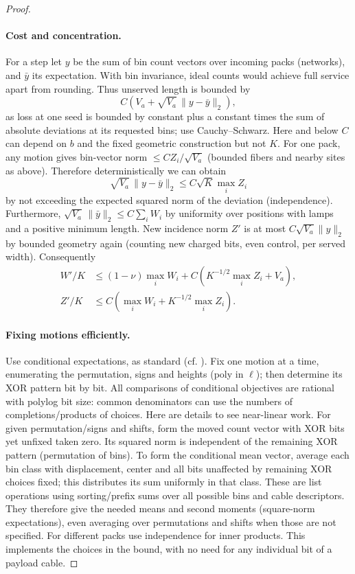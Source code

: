 \documentclass[11pt,letterpaper]{article}
\theoremstyle{definition}
\numberwithin{equation}{section}
\begin{document}
\begin{proof}
\paragraph{Cost and concentration.}
For a step let $y$ be the sum of bin count vectors over incoming
packs (networks), and $\bar y$ its expectation. With bin invariance, ideal counts would achieve
full service apart from rounding. Thus unserved length is bounded by
\[
  C\left(V_a+\sqrt{V_a}\,\lVert y-\bar y\rVert_2\right),
\]
as loss at one seed is bounded by constant plus a constant times the sum of absolute
deviations at its requested bins; use Cauchy--Schwarz. Here and below $C$ can depend on $b$
and the fixed geometric construction but not $K$. For one pack, any motion gives bin-vector
norm $\le CZ_i/\sqrt{V_a}$ (bounded fibers and nearby sites as above). Therefore deterministically
we can obtain
\[
  \sqrt{V_a}\,\lVert y-\bar y\rVert_2 \le C\sqrt{K}\max_i Z_i
\]
by not exceeding the expected squared norm of the deviation (independence). Furthermore,
$\sqrt{V_a}\,\lVert\bar y\rVert_2\le C\sum_i W_i$ by uniformity over positions with lamps and a
positive minimum length.
New incidence norm $Z'$ is at most $C\sqrt{V_a}\lVert y\rVert_2$ by bounded geometry again (counting new
charged bits, even control, per served width). Consequently
\[
  \begin{aligned}
    W'/K &\le(1-\nu)\max_i W_i+ C(K^{-1/2}\max_i Z_i+V_a), \\
    Z'/K &\le C(\max_i W_i+K^{-1/2}\max_i Z_i).
  \end{aligned}
\]
\paragraph{Fixing motions efficiently.}
Use conditional expectations, as standard (cf. \cite{Raghavan}). Fix
one motion at a time, enumerating the permutation, signs and heights (poly in $\ell$); then
determine its XOR pattern bit by bit. All comparisons of conditional objectives are rational
with polylog bit size: common denominators can use the numbers of completions/products
of choices. Here are details to see near-linear work. For given permutation/signs and shifts,
form the moved count vector with XOR bits yet unfixed taken zero. Its squared norm is
independent of the remaining XOR pattern (permutation of bins). To form the conditional
mean vector, average each bin class with displacement, center and all bits unaffected by
remaining XOR choices fixed; this distributes its sum uniformly in that class. These are
list operations using sorting/prefix sums over all possible bins and cable descriptors. They
therefore give the needed means and second moments (square-norm expectations), even
averaging over permutations and shifts when those are not specified. For different packs use
independence for inner products. This implements the choices in the bound, with no need
for any individual bit of a payload cable.


\end{proof}
\end{document}
